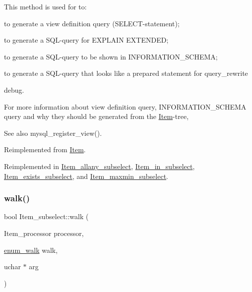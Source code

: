 This method is used for to\+:
\begin{DoxyItemize}
\item to generate a view definition query (S\+E\+L\+E\+CT-\/statement);
\item to generate a S\+QL-\/query for E\+X\+P\+L\+A\+IN E\+X\+T\+E\+N\+D\+ED;
\item to generate a S\+QL-\/query to be shown in I\+N\+F\+O\+R\+M\+A\+T\+I\+O\+N\+\_\+\+S\+C\+H\+E\+MA;
\item to generate a S\+QL-\/query that looks like a prepared statement for query\+\_\+rewrite
\item debug.
\end{DoxyItemize}

For more information about view definition query, I\+N\+F\+O\+R\+M\+A\+T\+I\+O\+N\+\_\+\+S\+C\+H\+E\+MA query and why they should be generated from the \mbox{\hyperlink{classItem}{Item}}-\/tree, \begin{DoxySeeAlso}{See also}
mysql\+\_\+register\+\_\+view(). 
\end{DoxySeeAlso}


Reimplemented from \mbox{\hyperlink{classItem_aa7ba4bde739d83adec8edf3bf1596d94}{Item}}.



Reimplemented in \mbox{\hyperlink{classItem__allany__subselect_ade4b2eaa6af0cde005b082598d2e31b0}{Item\+\_\+allany\+\_\+subselect}}, \mbox{\hyperlink{classItem__in__subselect_a8c80eb807d1c1219807fd45db61fad8f}{Item\+\_\+in\+\_\+subselect}}, \mbox{\hyperlink{classItem__exists__subselect_a795c650acea24859e6ff1d6f82d5a2ec}{Item\+\_\+exists\+\_\+subselect}}, and \mbox{\hyperlink{classItem__maxmin__subselect_ad03a1c165ac9ec019b5c7e80f108cddd}{Item\+\_\+maxmin\+\_\+subselect}}.

\mbox{\label{classItem__subselect_a163a5d1a04b9bf04d352aca85c084adf}} 
\subsubsection{\texorpdfstring{walk()}{walk()}}
{\footnotesize\ttfamily bool Item\+\_\+subselect\+::walk (\begin{DoxyParamCaption}\item[{Item\+\_\+processor}]{processor,  }\item[{\mbox{\hyperlink{classItem_a4e68f315ba2a26543339e9f0efed3695}{enum\+\_\+walk}}}]{walk,  }\item[{uchar $\ast$}]{arg }\end{DoxyParamCaption})\hspace{0.3cm}{\ttfamily [virtual]}}

